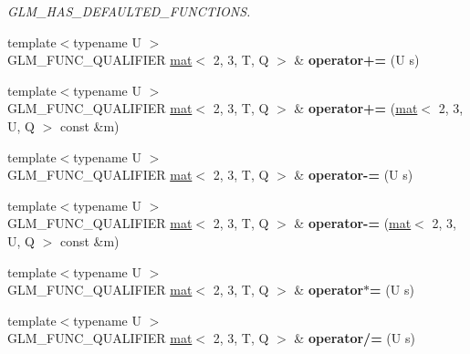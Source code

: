 \begin{DoxyCompactItemize}
\begin{DoxyCompactList}\small\item\em G\+L\+M\+\_\+\+H\+A\+S\+\_\+\+D\+E\+F\+A\+U\+L\+T\+E\+D\+\_\+\+F\+U\+N\+C\+T\+I\+O\+NS. \end{DoxyCompactList}\item 
\mbox{\label{structglm_1_1mat_3_012_00_013_00_01T_00_01Q_01_4_aef7d2e0667c80238e0a1a0144a6d822f}} 
{\footnotesize template$<$typename U $>$ }\\G\+L\+M\+\_\+\+F\+U\+N\+C\+\_\+\+Q\+U\+A\+L\+I\+F\+I\+ER \hyperlink{structglm_1_1mat}{mat}$<$ 2, 3, T, Q $>$ \& {\bfseries operator+=} (U s)
\item 
\mbox{\label{structglm_1_1mat_3_012_00_013_00_01T_00_01Q_01_4_a1ff8573bb278d2bc14b3360a652de986}} 
{\footnotesize template$<$typename U $>$ }\\G\+L\+M\+\_\+\+F\+U\+N\+C\+\_\+\+Q\+U\+A\+L\+I\+F\+I\+ER \hyperlink{structglm_1_1mat}{mat}$<$ 2, 3, T, Q $>$ \& {\bfseries operator+=} (\hyperlink{structglm_1_1mat}{mat}$<$ 2, 3, U, Q $>$ const \&m)
\item 
\mbox{\label{structglm_1_1mat_3_012_00_013_00_01T_00_01Q_01_4_ad5e38086f1227daddc1ab3747efb750b}} 
{\footnotesize template$<$typename U $>$ }\\G\+L\+M\+\_\+\+F\+U\+N\+C\+\_\+\+Q\+U\+A\+L\+I\+F\+I\+ER \hyperlink{structglm_1_1mat}{mat}$<$ 2, 3, T, Q $>$ \& {\bfseries operator-\/=} (U s)
\item 
\mbox{\label{structglm_1_1mat_3_012_00_013_00_01T_00_01Q_01_4_a3392fc843cab0b2ff28582955a12af76}} 
{\footnotesize template$<$typename U $>$ }\\G\+L\+M\+\_\+\+F\+U\+N\+C\+\_\+\+Q\+U\+A\+L\+I\+F\+I\+ER \hyperlink{structglm_1_1mat}{mat}$<$ 2, 3, T, Q $>$ \& {\bfseries operator-\/=} (\hyperlink{structglm_1_1mat}{mat}$<$ 2, 3, U, Q $>$ const \&m)
\item 
\mbox{\label{structglm_1_1mat_3_012_00_013_00_01T_00_01Q_01_4_ac7f40e9c90e250e74982d6c83eb07604}} 
{\footnotesize template$<$typename U $>$ }\\G\+L\+M\+\_\+\+F\+U\+N\+C\+\_\+\+Q\+U\+A\+L\+I\+F\+I\+ER \hyperlink{structglm_1_1mat}{mat}$<$ 2, 3, T, Q $>$ \& {\bfseries operator$\ast$=} (U s)
\item 
\mbox{\label{structglm_1_1mat_3_012_00_013_00_01T_00_01Q_01_4_a52c908488ef91afb7a1f68e9e3ddb606}} 
{\footnotesize template$<$typename U $>$ }\\G\+L\+M\+\_\+\+F\+U\+N\+C\+\_\+\+Q\+U\+A\+L\+I\+F\+I\+ER \hyperlink{structglm_1_1mat}{mat}$<$ 2, 3, T, Q $>$ \& {\bfseries operator/=} (U s)
\end{DoxyCompactItemize}
